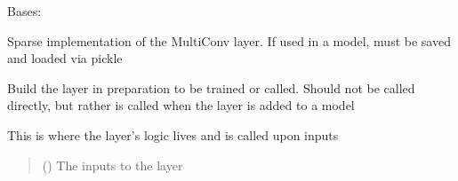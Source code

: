 \documentclass[letterpaper,10pt,english]{sphinxmanual}
\begin{document}
\begin{fulllineitems}
\label{\detokenize{beyondml.tflow.layers:beyondml.tflow.layers.SparseMultiConv2D.SparseMultiConv2D}}
\pysigstartsignatures
{}
\pysigstopsignatures
\sphinxAtStartPar
Bases: 

\sphinxAtStartPar
Sparse implementation of the MultiConv layer. If used in a model, must be saved and loaded via pickle

\begin{fulllineitems}
\label{\detokenize{beyondml.tflow.layers:beyondml.tflow.layers.SparseMultiConv2D.SparseMultiConv2D.build}}
\pysigstartsignatures
{}
\pysigstopsignatures
\sphinxAtStartPar
Build the layer in preparation to be trained or called. Should not be called directly,
but rather is called when the layer is added to a model

\end{fulllineitems}


\begin{fulllineitems}
\label{\detokenize{beyondml.tflow.layers:beyondml.tflow.layers.SparseMultiConv2D.SparseMultiConv2D.call}}
\pysigstartsignatures
{}
\pysigstopsignatures
\sphinxAtStartPar
This is where the layer’s logic lives and is called upon inputs
\begin{quote}\begin{description}
\sphinxAtStartPar
{} () \textendash{} The inputs to the layer


\end{description}
\end{quote}
\end{fulllineitems}
\end{fulllineitems}
\end{document}
